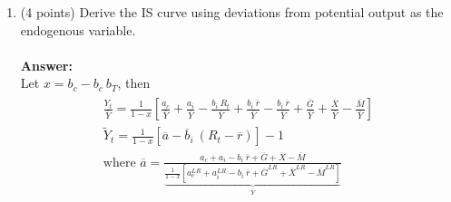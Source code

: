 \documentclass[letterpaper,12pt]{article}
\theoremstyle{dotlessS}
\begin{document}
\begin{enumerate}[label=(\alph*)]
\item (4 points) Derive the IS curve using deviations from potential output as the endogenous variable.\\
\\
\textbf{Answer:}\\
Let $x=b_c-b_c \: b_T$, then
\begin{eqnarray*}
\begin{array}{l}
\frac{Y_t}{\overline{Y}}=\frac{1}{1-x}\left[\frac{a_c}{\overline{Y}}+\frac{a_i}{\overline{Y}}-\frac{b_i \: R_t}{\overline{Y}}+\frac{b_i \: \overline{r}}{\overline{Y}}-\frac{b_i \: \overline{r}}{\overline{Y}}+\frac{\overline{G}}{\overline{Y}}+\frac{\overline{X}}{\overline{Y}}-\frac{\overline{M}}{\overline{Y}}\right] \\[3ex]
\widetilde{Y}_t=\frac{1}{1-x}\left[\overline{a}-\overline{b}_i \: (R_t-\overline{r})\right]-1  \\[3ex]
\text{where   } \overline{a}=\frac{a_c+a_i-b_i \: \overline{r}+\overline{G}+\overline{X}-\overline{M}}{\underbrace{\frac{1}{1-x} \left[a_c^{LR}+a_i^{LR}-b_i \: \overline{r}+\overline{G}^{LR}+\overline{X}^{LR}-\overline{M}^{LR}\right]}_{\overline{Y}}}
\end{array}
\end{eqnarray*}


\end{enumerate}
\end{document}
